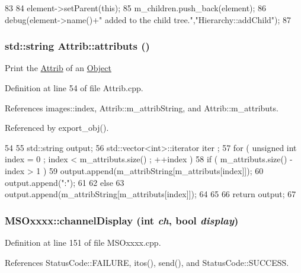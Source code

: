 \begin{DoxyCode}
83                                           {
84   element->setParent(this);
85   m_children.push_back(element);
86   debug(element->name()+" added to the child tree.","Hierarchy::addChild");
87 }
\end{DoxyCode}
\hypertarget{classAttrib_aee7bbf16b144887f196e1341b24f8a26}{
\subsubsection[{attributs}]{\setlength{\rightskip}{0pt plus 5cm}std::string Attrib::attributs ()}}
\label{classAttrib_aee7bbf16b144887f196e1341b24f8a26}
Print the \hyperlink{classAttrib}{Attrib} of an \hyperlink{classObject}{Object} 

Definition at line 54 of file Attrib.cpp.

References images::index, Attrib::m\_\-attribString, and Attrib::m\_\-attributs.

Referenced by export\_\-obj().


\begin{DoxyCode}
54                             {
55   std::string output;
56   std::vector<int>::iterator iter ;
57   for ( unsigned int index = 0 ; index < m_attributs.size() ; ++index ) {
58     if ( m_attributs.size() - index > 1 ) {
59       output.append(m_attribString[m_attributs[index]]);
60       output.append(":");
61     }
62     else {
63       output.append(m_attribString[m_attributs[index]]);
64     }
65   }
66   return output;
67 }
\end{DoxyCode}
\hypertarget{classMSOxxxx_a4cb8e745f172b7a30953ec87923c8c76}{
\subsubsection[{channelDisplay}]{ MSOxxxx::channelDisplay (int {\em ch}, \/  bool {\em display})}}
\label{classMSOxxxx_a4cb8e745f172b7a30953ec87923c8c76}


Definition at line 151 of file MSOxxxx.cpp.

References StatusCode::FAILURE, itos(), send(), and StatusCode::SUCCESS.

